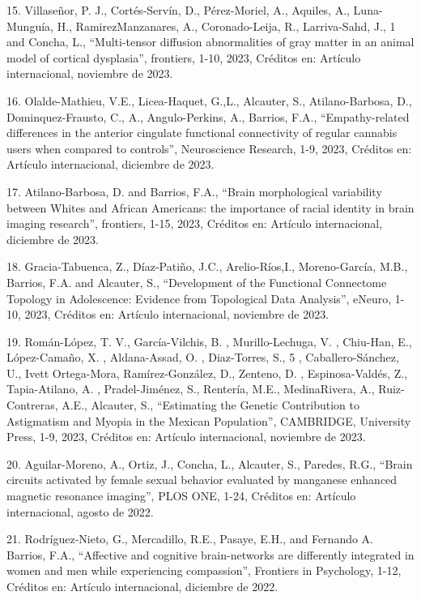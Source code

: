 15. Villaseñor, P. J., Cortés-Servín, D., Pérez-Moriel, A., Aquiles, A., Luna-Munguía, H., RamirezManzanares, A., 
Coronado-Leija, R., Larriva-Sahd, J., 1 and Concha, L., “Multi-tensor diffusion abnormalities of gray matter in an animal model 
of cortical dysplasia”, frontiers, 1-10, 2023, Créditos en: Artículo internacional, noviembre de 2023.

16. Olalde-Mathieu, V.E., Licea-Haquet, G.,L., Alcauter, S., Atilano-Barbosa, D., Dominquez-Frausto, C., A., Angulo-Perkins, 
A., Barrios, F.A., “Empathy-related differences in the anterior cingulate functional connectivity of regular cannabis users 
when compared to controls”, Neuroscience Research, 1-9, 2023, Créditos en: Artículo internacional, diciembre de 2023.

17. Atilano-Barbosa, D. and Barrios, F.A., “Brain morphological variability between Whites and African Americans: the 
importance of racial identity in brain imaging research”, frontiers, 1-15, 2023, Créditos en: Artículo internacional, diciembre 
de 2023.

18. Gracia-Tabuenca, Z., Díaz-Patiño, J.C., Arelio-Ríos,I., Moreno-García, M.B., Barrios, F.A. and Alcauter, S., “Development 
of the Functional Connectome Topology in Adolescence: Evidence from Topological Data Analysis”, eNeuro, 1-10, 2023, Créditos 
en: Artículo internacional, noviembre de 2023.

19. Román-López, T. V., García-Vilchis, B. , Murillo-Lechuga, V. , Chiu-Han, E., López-Camaño, X. , Aldana-Assad, O. , 
Diaz-Torres, S., 5 , Caballero-Sánchez, U., Ivett Ortega-Mora, Ramírez-González, D., Zenteno, D. , Espinosa-Valdés, Z., 
Tapia-Atilano, A. , Pradel-Jiménez, S., Rentería, M.E., MedinaRivera, A., Ruiz-Contreras, A.E., Alcauter, S., “Estimating the 
Genetic Contribution to Astigmatism and Myopia in the Mexican Population”, CAMBRIDGE, University Press, 1-9, 2023, Créditos en: 
Artículo internacional, noviembre de 2023.

20. Aguilar-Moreno, A., Ortiz, J., Concha, L., Alcauter, S., Paredes, R.G., “Brain circuits activated by female sexual behavior 
evaluated by manganese enhanced magnetic resonance imaging”, PLOS ONE, 1-24, Créditos en: Artículo internacional, agosto de 
2022.

21. Rodríguez-Nieto, G., Mercadillo, R.E., Pasaye, E.H., and Fernando A. Barrios, F.A., “Affective and cognitive brain-networks 
are differently integrated in women and men while experiencing compassion”, Frontiers in Psychology, 1-12, Créditos en: 
Artículo internacional, diciembre de 2022.

